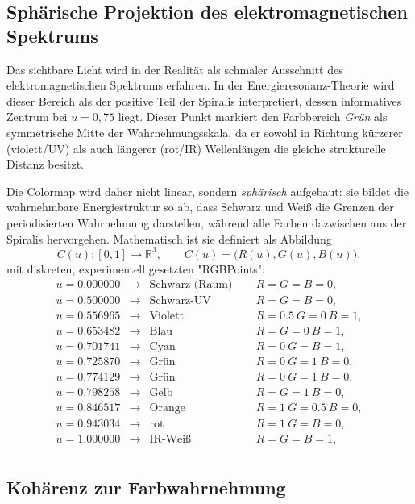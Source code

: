 \subsection{Sphärische Projektion des elektromagnetischen Spektrums}

Das sichtbare Licht wird in der Realität als schmaler Ausschnitt des 
elektromagnetischen Spektrums erfahren. In der Energieresonanz-Theorie wird 
dieser Bereich als der positive Teil der Spiralis interpretiert, 
dessen informatives Zentrum bei $u = 0{,}75$ liegt. 
Dieser Punkt markiert den Farbbereich \emph{Grün} als symmetrische Mitte 
der Wahrnehmungsskala, da er sowohl in Richtung kürzerer (violett/UV) 
als auch längerer (rot/IR) Wellenlängen die gleiche strukturelle Distanz besitzt. 

Die Colormap wird daher nicht linear, sondern \emph{sphärisch} aufgebaut:
sie bildet die wahrnehmbare Energiestruktur so ab, 
dass Schwarz und Weiß die Grenzen der periodisierten Wahrnehmung darstellen,
während alle Farben dazwischen aus der Spiralis hervorgehen. 
Mathematisch ist sie definiert als Abbildung
\[
C(u): [0,1] \to \mathbb{R}^3, \qquad 
C(u) = \bigl(R(u),G(u),B(u)\bigr),
\]
mit diskreten, experimentell gesetzten "RGBPoints":
\[
\begin{array}{rclcl}
u=0.000000   &\rightarrow& \text{Schwarz (Raum)} \ &\;& R=G=B=0, \\[2pt]
u=0.500000   &\rightarrow& \text{Schwarz-UV}\ &\;& R=G=B=0, \\[2pt]
u=0.556965  &\rightarrow& \text{Violett}\ &\;& R=0.5\ G=0\ B=1, \\[2pt]
u=0.653482  &\rightarrow& \text{Blau}\ &\;& R=G=0\ B=1, \\[2pt]
u=0.701741  &\rightarrow& \text{Cyan}\ &\;& R=0\ G=B=1, \\[2pt]
u=0.725870  &\rightarrow& \text{Grün}\ &\;& R=0\ G=1\ B=0, \\[2pt]
u=0.774129  &\rightarrow& \text{Grün}\ &\;& R=0\ G=1\ B=0, \\[2pt]
u=0.798258   &\rightarrow& \text{Gelb}\ &\;& R=G=1\ B=0, \\[2pt]
u=0.846517   &\rightarrow& \text{Orange}\ &\;& R=1\ G=0.5\ B=0, \\[2pt]
u=0.943034   &\rightarrow& \text{rot}\ &\;& R=1\ G=B=0, \\[2pt]
u=1.000000   &\rightarrow& \text{IR-Weiß}\ &\;& R=G=B=1, \\[2pt]
\end{array}
\]

\subsection{Kohärenz zur Farbwahrnehmung}

